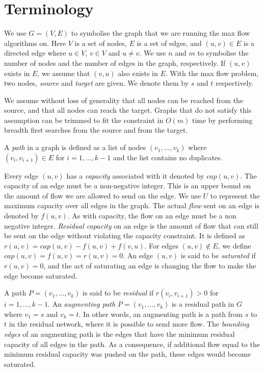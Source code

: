 
\section{Terminology}
\label{TerminologySection}

We use $G=(V, E)$ to symbolise the graph that we are running the max flow algorithms on.
Here $V$ is a set of nodes, $E$ is a set of edges, and $(u, v)\in E$ is a directed edge where $u\in V$, $v \in V$ and $u \not= v$.
We use $n$ and $m$ to symbolise the number of nodes and the number of edges in the graph, respectively.
If $(u, v)$ exists in $E$, we assume that $(v, u)$ also exists in $E$.
With the max flow problem, two nodes, \emph{source} and \emph{target} are given. We denote them by $s$ and $t$ respectively.

We assume without loss of generality that all nodes can be reached from the source, and that all nodes can reach the target. 
Graphs that do not satisfy this assumption can be trimmed to fit the constraint in $O(m)$ time by performing breadth first searches from the source and from the target.

A \emph{path} in a graph is defined as a list of nodes $(v_1, \ldots , v_k)$ where \\
$(v_i, v_{i+1}) \in E$ for $i=1, \ldots, k-1$ and the list contains no duplicates.

Every edge $(u, v)$ has a \emph{capacity} associated with it denoted by $cap(u, v)$. The capacity of an edge must be a non-negative integer. This is an upper bound on the amount of flow we are allowed to send on the edge.
We use $U$ to represent the maximum capacity over all edges in the graph.
The actual \emph{flow} sent on an edge is denoted by $f(u, v)$. As with capacity, the flow on an edge must be a non negative integer. 
\emph{Residual capacity} on an edge is the amount of flow that can still be sent on the edge without violating the capacity constraint.
It is defined as $r(u, v) = cap(u, v) - f(u, v) + f(v, u)$. For edges $(u, v)\not\in E$, we define $cap(u, v)=f(u, v)=r(u, v)=0$.
An edge $(u, v)$ is said to be \emph{saturated} if $r(u, v) = 0$, and the act of saturating an edge is changing the flow to make the edge become saturated.

A path $P=(v_1, \ldots , v_k)$ is said to be \emph{residual} if $r(v_i, v_{i+1}) > 0$ for $i=1, \ldots, k-1$.
An \emph{augmenting path} $P=(v_1, \ldots , v_k)$ is a residual path in $G$ where $v_1 = s$ and $v_k = t$.
In other words, an augmenting path is a path from $s$ to $t$ in the residual network, where it is possible to send more flow.
The \emph{bounding edges} of an augmenting path is the edges that have the minimum residual capacity of all edges in the path.
As a consequence, if additional flow equal to the minimum residual capacity was pushed on the path, these edges would become saturated.

